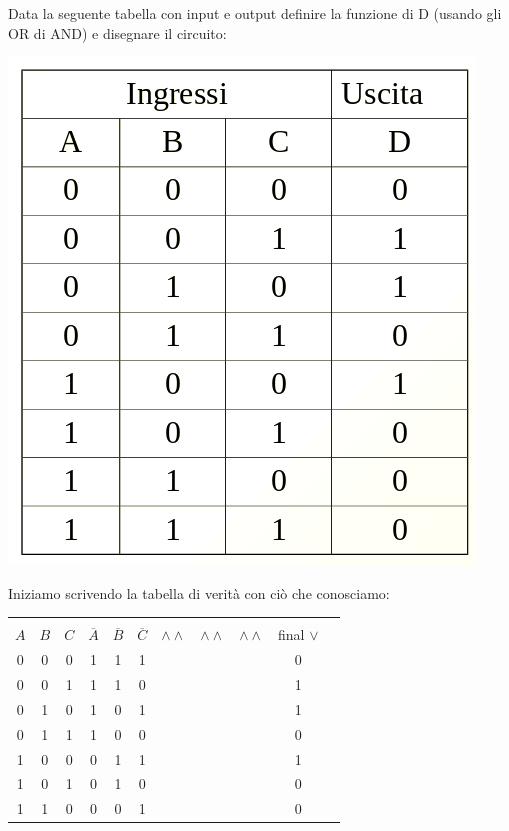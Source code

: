 \documentclass[a4paper,12pt, oneside]{book}
\begin{document}
\begin{esercizio}
Data la seguente tabella con input e output definire la funzione di D (usando gli OR di AND) e disegnare il circuito:
\begin{center}
\includegraphics[scale=0.7]{img/es3.png}
\end{center}
Iniziamo scrivendo la tabella di verità con ciò che conosciamo:
\begin{center}
\begin{tabular}{|c|c|c|c|c|c|c|c|c|c|c|}
\hline 
& & & & & & & & & \\
$A$ & $B$ & $C$ & $\overline{A}$ & $\overline{B}$ & $\overline{C}$ & $\wedge \wedge $  & $\wedge \wedge $ & $\wedge \wedge$ & final $\vee$\\
\hline
0 & 0 & 0 & 1 & 1 & 1 &  &  &  &  0\\
\hline
0 & 0 & 1 & 1 & 1 & 0 &  &  &  &  1\\
\hline
0 & 1 & 0 & 1 & 0 & 1 &  &  &  &  1\\
\hline
0 & 1 & 1 & 1 & 0 & 0 &  &  &  &  0\\
\hline
1 & 0 & 0 & 0 & 1 & 1 &  &  &  &  1\\
\hline
1 & 0 & 1 & 0 & 1 & 0 &  &  &  &  0\\
\hline
1 & 1 & 0 & 0 & 0 & 1 &  &  &  &  0\\
\hline

\end{tabular}
\end{center}
\end{esercizio}
\end{document}
